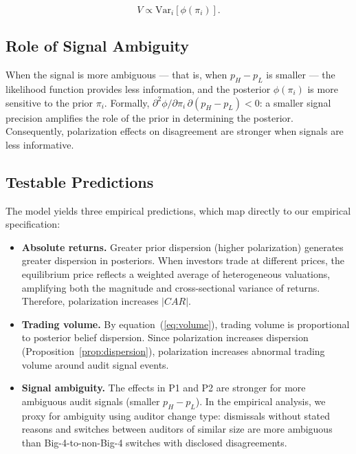 \begin{equation}
    \label{eq:volume}
    V \propto \text{Var}_i[\phi(\pi_i)].
\end{equation}

\subsection{Role of Signal Ambiguity}

When the signal is more ambiguous — that is, when $p_H - p_L$ is smaller —
the likelihood function provides less information, and the posterior
$\phi(\pi_i)$ is more sensitive to the prior $\pi_i$. Formally,
$\partial^2 \phi / \partial \pi_i \, \partial (p_H - p_L) < 0$: a smaller
signal precision amplifies the role of the prior in determining the posterior.
Consequently, polarization effects on disagreement are stronger when signals
are less informative.

\subsection{Testable Predictions}

The model yields three empirical predictions, which map directly to our
empirical specification:

\begin{itemize}
    \item[\textbf{P1.}] \textbf{Absolute returns.}
        Greater prior dispersion (higher polarization) generates greater
        dispersion in posteriors. When investors trade at different prices,
        the equilibrium price reflects a weighted average of heterogeneous
        valuations, amplifying both the magnitude and cross-sectional
        variance of returns. Therefore, polarization increases $|CAR|$.

    \item[\textbf{P2.}] \textbf{Trading volume.}
        By equation~(\ref{eq:volume}), trading volume is proportional to
        posterior belief dispersion. Since polarization increases dispersion
        (Proposition~\ref{prop:dispersion}), polarization increases abnormal
        trading volume around audit signal events.

    \item[\textbf{P3.}] \textbf{Signal ambiguity.}
        The effects in P1 and P2 are stronger for more ambiguous audit signals
        (smaller $p_H - p_L$). In the empirical analysis, we proxy for
        ambiguity using auditor change type: dismissals without stated reasons
        and switches between auditors of similar size are more ambiguous than
        Big-4-to-non-Big-4 switches with disclosed disagreements.
\end{itemize}

